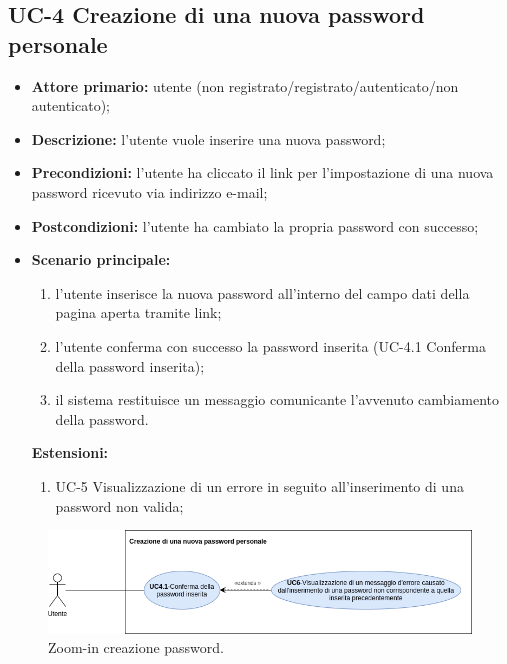 \subsection{UC-4 Creazione di una nuova password personale}
\begin{itemize}
	\item \textbf{Attore primario:} utente (non registrato/registrato/autenticato/non autenticato);

	\item \textbf{Descrizione:} l'utente vuole inserire una nuova password;

	\item \textbf{Precondizioni:} l'utente ha cliccato il link per l'impostazione di una nuova password ricevuto via indirizzo e-mail;

	\item \textbf{Postcondizioni:} l'utente ha cambiato la propria password con successo;

	\item \textbf{Scenario principale:}
	      \begin{enumerate}
		      \item l'utente inserisce la nuova password all'interno del campo dati della pagina aperta tramite link;
		      \item l'utente conferma con successo la password inserita (UC-4.1 Conferma della password inserita);
		      \item il sistema restituisce un messaggio comunicante l'avvenuto cambiamento della password.
	      \end{enumerate}

	      \textbf{Estensioni:}
	      \begin{enumerate}
		      \item UC-5 Visualizzazione di un errore in seguito all'inserimento di una password non valida;
	      \end{enumerate}
\end{itemize}

\begin{figure}[H]
	\centering
	\includegraphics[width=\textwidth]{src/CasiDUso/immagini/SottocasoCreazionePassword.png}
	\caption{Zoom-in creazione password.}
\end{figure}

